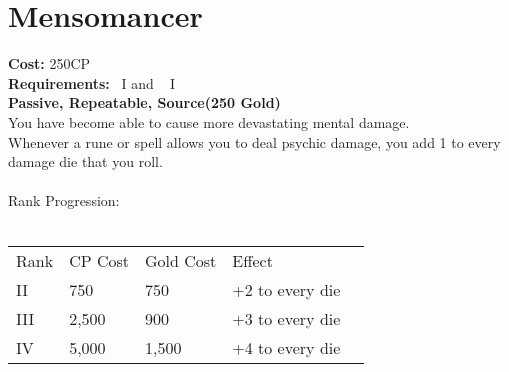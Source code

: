 \section{Mensomancer}\label{perk:mensomancer}
\textbf{Cost:} 250CP\\
\textbf{Requirements:}~ I and ~ I\\
\textbf{Passive, Repeatable, Source(250 Gold)}\\
You have become able to cause more devastating mental damage.\\
Whenever a rune or spell allows you to deal psychic damage, you add 1 to every damage die that you roll.\\
\\
Rank Progression:\\
\\
\begin{tabular}{l | l | l | l | l}
    Rank & CP Cost & Gold Cost &  Effect\\
    II & 750 & 750 & +2 to every die\\
    III & 2,500 & 900 & +3 to every die\\
    IV & 5,000 & 1,500 & +4 to every die\\
\end{tabular}